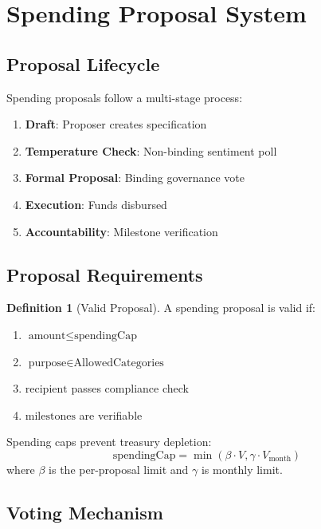 \documentclass[11pt,a4paper]{article}
\theoremstyle{definition}
\newtheorem{definition}{Definition}[section]
\theoremstyle{remark}
\begin{document}
\section{Spending Proposal System}

\subsection{Proposal Lifecycle}

Spending proposals follow a multi-stage process:

\begin{enumerate}
    \item \textbf{Draft}: Proposer creates specification
    \item \textbf{Temperature Check}: Non-binding sentiment poll
    \item \textbf{Formal Proposal}: Binding governance vote
    \item \textbf{Execution}: Funds disbursed
    \item \textbf{Accountability}: Milestone verification
\end{enumerate}

\subsection{Proposal Requirements}

\begin{definition}[Valid Proposal]
A spending proposal is valid if:
\begin{enumerate}
    \item $\text{amount} \leq \text{spendingCap}$
    \item $\text{purpose} \in \text{AllowedCategories}$
    \item $\text{recipient}$ passes compliance check
    \item $\text{milestones}$ are verifiable
\end{enumerate}
\end{definition}

Spending caps prevent treasury depletion:
\begin{equation}
    \text{spendingCap} = \min\left(\beta \cdot V, \gamma \cdot V_{\text{month}}\right)
\end{equation}
where $\beta$ is the per-proposal limit and $\gamma$ is monthly limit.

\subsection{Voting Mechanism}
\end{document}

